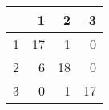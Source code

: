 \begin{tabular}{rrrr}
  \hline
 & 1 & 2 & 3 \\ 
  \hline
1 &  17 &   1 &   0 \\ 
  2 &   6 &  18 &   0 \\ 
  3 &   0 &   1 &  17 \\ 
   \hline
\end{tabular}
